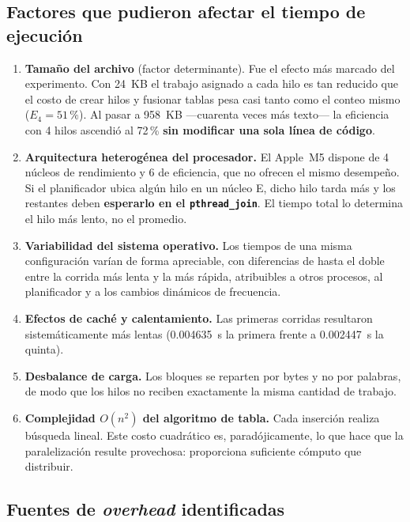 \documentclass[11pt,letterpaper]{article}
\begin{document}
\subsection{Factores que pudieron afectar el tiempo de ejecución}

\begin{enumerate}[label=\textbf{\arabic*.}]
  \item \textbf{Tamaño del archivo} (factor determinante). Fue el efecto más
        marcado del experimento. Con 24~KB el trabajo asignado a cada hilo es tan
        reducido que el costo de crear hilos y fusionar tablas pesa casi tanto
        como el conteo mismo ($E_4 = 51\,\text{\%}$). Al pasar a 958~KB —cuarenta veces
        más texto— la eficiencia con 4 hilos ascendió al 72\,\% \textbf{sin
        modificar una sola línea de código}.
  \item \textbf{Arquitectura heterogénea del procesador.} El Apple~M5 dispone de
        4 núcleos de rendimiento y 6 de eficiencia, que no ofrecen el mismo
        desempeño. Si el planificador ubica algún hilo en un núcleo E, dicho hilo
        tarda más y los restantes deben \textbf{esperarlo en el
        \texttt{pthread\_join}}. El tiempo total lo determina el hilo más lento,
        no el promedio.
  \item \textbf{Variabilidad del sistema operativo.} Los tiempos de una misma
        configuración varían de forma apreciable, con diferencias de hasta el
        doble entre la corrida más lenta y la más rápida, atribuibles a otros
        procesos, al planificador y a los cambios dinámicos de frecuencia.
  \item \textbf{Efectos de caché y calentamiento.} Las primeras corridas
        resultaron sistemáticamente más lentas (\num{0.004635}~s la primera
        frente a \num{0.002447}~s la quinta).
  \item \textbf{Desbalance de carga.} Los bloques se reparten por bytes y no por
        palabras, de modo que los hilos no reciben exactamente la misma cantidad
        de trabajo.
  \item \textbf{Complejidad $O(n^2)$ del algoritmo de tabla.} Cada inserción
        realiza búsqueda lineal. Este costo cuadrático es, paradójicamente, lo
        que hace que la paralelización resulte provechosa: proporciona suficiente
        cómputo que distribuir.
\end{enumerate}

\subsection{Fuentes de \emph{overhead} identificadas}
\label{sec:overhead}
\end{document}
